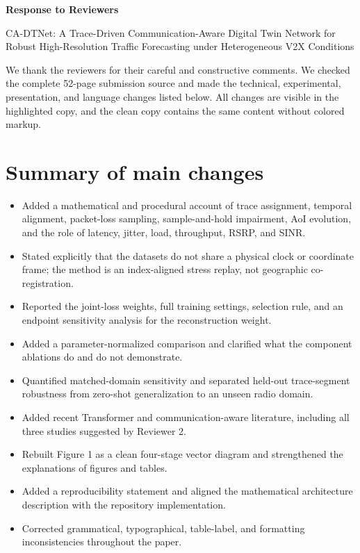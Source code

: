 \documentclass[11pt]{article}
\begin{document}
\begin{center}
{\Large\bfseries Response to Reviewers}\par
\vspace{4pt}
{\large CA-DTNet: A Trace-Driven Communication-Aware Digital Twin Network for Robust High-Resolution Traffic Forecasting under Heterogeneous V2X Conditions}
\end{center}

We thank the reviewers for their careful and constructive comments. We checked the complete 52-page submission source and made the technical, experimental, presentation, and language changes listed below. All changes are visible in the highlighted copy, and the clean copy contains the same content without colored markup.

\section*{Summary of main changes}

\begin{itemize}[leftmargin=18pt]
\item Added a mathematical and procedural account of trace assignment, temporal alignment, packet-loss sampling, sample-and-hold impairment, AoI evolution, and the role of latency, jitter, load, throughput, RSRP, and SINR.
\item Stated explicitly that the datasets do not share a physical clock or coordinate frame; the method is an index-aligned stress replay, not geographic co-registration.
\item Reported the joint-loss weights, full training settings, selection rule, and an endpoint sensitivity analysis for the reconstruction weight.
\item Added a parameter-normalized comparison and clarified what the component ablations do and do not demonstrate.
\item Quantified matched-domain sensitivity and separated held-out trace-segment robustness from zero-shot generalization to an unseen radio domain.
\item Added recent Transformer and communication-aware literature, including all three studies suggested by Reviewer 2.
\item Rebuilt Figure 1 as a clean four-stage vector diagram and strengthened the explanations of figures and tables.
\item Added a reproducibility statement and aligned the mathematical architecture description with the repository implementation.
\item Corrected grammatical, typographical, table-label, and formatting inconsistencies throughout the paper.
\end{itemize}
\end{document}
